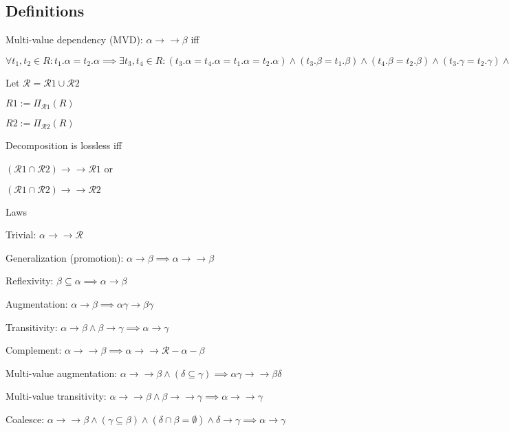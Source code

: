 \subsection{Definitions}
\enumstart
	\item Multi-value dependency (MVD): $\alpha \rightarrow \rightarrow \beta$ iff
	\enumstart
		\item $\forall t_1, t_2 \in R: t_1.\alpha = t_2.\alpha \implies \exists t_3, t_4 \in R: (t_3.\alpha = t_4.\alpha = t_1.\alpha = t_2.\alpha) \land (t_3.\beta = t_1.\beta) \land (t_4.\beta = t_2.\beta) \land (t_3.\gamma = t_2.\gamma) \land (t_4.\gamma = t_1.\gamma)$
	\enumend
	\item Let $\mathcal{R} = \mathcal{R}1 \cup \mathcal{R}2 $
	\item $R1 := \Pi_{\mathcal{R}1}(R)$
	\item $R2 := \Pi_{\mathcal{R}2}(R)$
	\item Decomposition is lossless iff
	\enumstart
		\item $(\mathcal{R}1 \cap \mathcal{R}2) \rightarrow \rightarrow \mathcal{R}1$ or
		\item $(\mathcal{R}1 \cap \mathcal{R}2) \rightarrow \rightarrow \mathcal{R}2$
	\enumend
	\item Laws
	\enumstart
		\item Trivial: $\alpha \rightarrow \rightarrow \mathcal{R}$
		\item Generalization (promotion): $\alpha \rightarrow \beta \implies \alpha \rightarrow\rightarrow \beta$
		\item Reflexivity: $\beta \subseteq \alpha \implies \alpha \rightarrow \beta$
		\item Augmentation: $\alpha \rightarrow \beta \implies \alpha\gamma \rightarrow \beta\gamma$
		\item Transitivity: $\alpha \rightarrow \beta \land \beta \rightarrow \gamma \implies \alpha \rightarrow \gamma$
		\item Complement: $\alpha \rightarrow\rightarrow \beta \implies \alpha \rightarrow \rightarrow \mathcal{R}-\alpha-\beta$
		\item Multi-value augmentation: $\alpha \rightarrow\rightarrow \beta \land (\delta \subseteq \gamma) \implies \alpha \gamma \rightarrow\rightarrow \beta\delta$
		\item Multi-value transitivity: $\alpha \rightarrow\rightarrow \beta \land \beta \rightarrow\rightarrow \gamma \implies \alpha \rightarrow\rightarrow \gamma$
		\item Coalesce: $\alpha \rightarrow\rightarrow \beta \land (\gamma \subseteq \beta) \land (\delta \cap \beta = \emptyset) \land \delta \rightarrow \gamma \implies \alpha \rightarrow \gamma$
